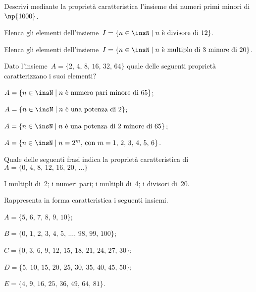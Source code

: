 \begin{esercizio}
\label{ese:\thechapter.21}
Descrivi mediante la proprietà caratteristica l'insieme dei numeri primi minori di~$\np{1000}$.
\end{esercizio}

\begin{esercizio}
\label{ese:\thechapter.22}
Elenca gli elementi dell'insieme~$I=\{n\in\insN\mid n\text{ è divisore di }12\}$.
\end{esercizio}

\begin{esercizio}
\label{ese:\thechapter.23}
Elenca gli elementi dell'insieme~$I=\{n\in\insN\mid n\text{ è multiplo di~3 minore di }20\}$.
\end{esercizio}

\begin{esercizio}
\label{ese:\thechapter.24}
Dato l'insieme~$A=\{\text{2, 4, 8, 16, 32, 64}\}$ quale delle seguenti proprietà caratterizzano i suoi elementi?
\begin{enumeratea}
\item $A=\{n\in\insN\mid n \text{ è numero pari minore di 65}\}$;
\item $A=\{n\in\insN\mid n\text{ è una potenza di 2}\}$;
\item $A=\{n\in\insN\mid n\text{ è una potenza di~2 minore di 65}\}$;
\item $A=\{n\in\insN\mid n=2^{m}\text{, con }m=\text{1, 2, 3, 4, 5, 6}\}$.
\end{enumeratea}
\end{esercizio}

\begin{esercizio}
\label{ese:\thechapter.25}
Quale delle seguenti frasi indica la proprietà caratteristica
di~$A=\{\text{0, 4, 8, 12, 16, 20, }\ldots\}$
\begin{center}
\boxA\quad I multipli di~2; \quad\boxB\quad i numeri pari; \quad\boxC\quad i multipli di~4; \quad\boxD\quad i divisori di~20.
\end{center}
\end{esercizio}

\begin{esercizio}
\label{ese:\thechapter.26}
Rappresenta in forma caratteristica i seguenti insiemi.
\begin{multicols}{2}
\begin{enumeratea}
\item $A=\{\text{5, 6, 7, 8, 9, 10}\}$;
\item $B=\{\text{0, 1, 2, 3, 4, 5, \ldots, 98, 99, 100}\}$;
\item $C=\{\text{0, 3, 6, 9, 12, 15, 18, 21, 24, 27, 30}\}$;
\item $D=\{\text{5, 10, 15, 20, 25, 30, 35, 40, 45, 50}\}$;
\item $E=\{\text{4, 9, 16, 25, 36, 49, 64, 81}\}$.
\end{enumeratea}
\end{multicols}
\end{esercizio}

